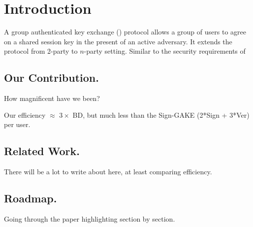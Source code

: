 \newcommand{\introGAKE}{\text{GAKE}\xspace}
\newcommand{\introAKE}{\text{AKE}\xspace}


\section{Introduction}\label{sec:introduction}
A group authenticated key exchange (\introGAKE) protocol allows a group of users to agree on a shared session key in the present of an active adversary. It extends the \introAKE protocol from 2-party to $n$-party setting. Similar to the security requirements of \

\subsection{Our Contribution.}
How magnificent have we been?

Our efficiency $\approx$ $3\times $ BD, but much less than the Sign-GAKE (2*Sign + 3*Ver) per user.

\subsection{Related Work.}
There will be a lot to write about here, at least comparing efficiency.

\subsection{Roadmap.}
Going through the paper highlighting section by section.

